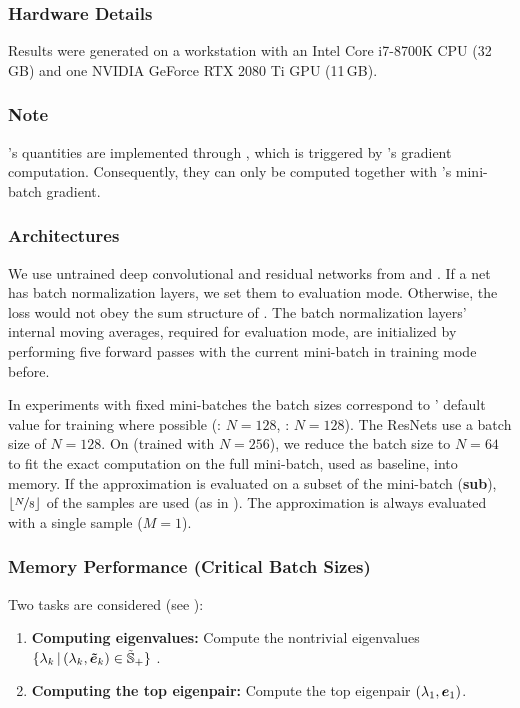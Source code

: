 \subsubsection{Hardware Details}

Results were generated on a workstation with an Intel Core i7-8700K CPU (32\,GB)
and one NVIDIA GeForce RTX 2080 Ti GPU (11\,GB).

\subsubsection{Note}

\vivit{}'s quantities are implemented through \backpack, which is triggered by
\pytorch's gradient computation. Consequently, they can only be computed
together with \pytorch{}'s mini-batch gradient.

\subsubsection{Architectures}

We use untrained deep convolutional and residual networks from \deepobs
\cite{schneider2019deepobs} and \cite{idelbayev2018proper}. If a net has batch
normalization layers, we set them to evaluation mode. Otherwise, the loss would
not obey the sum structure of . The batch
normalization layers' internal moving averages, required for evaluation mode,
are initialized by performing five forward passes with the current mini-batch in
training mode before.

In experiments with fixed mini-batches the batch sizes correspond to \deepobs'
default value for training where possible (\cifarten: $N=128$, \fmnist:
$N=128$). The ResNets use a batch size of $N=128$. On \cifarhun
(trained with $N=256$), we reduce the batch size to $N=64$ to fit the exact
computation on the full mini-batch, used as baseline, into memory. If the \ggn
approximation is evaluated on a subset of the mini-batch (\textbf{sub}),
$\lfloor \nicefrac{N}{8} \rfloor$ of the samples are used (as in
\cite{zhang2017blockdiagonal}). The \mc approximation is always evaluated with a
single sample ($M=1$).

\subsubsection{Memory Performance (Critical Batch Sizes)}

Two tasks are considered (see ):
\begin{enumerate}
\item \textbf{Computing eigenvalues:} Compute the nontrivial eigenvalues
  $\{\lambda_{k}\,|\, (\lambda_{k}, \bm{\tilde{e}}_{k}) \in \tilde{{\mathbb{S}}}_+\}$ .
\item \textbf{Computing the top eigenpair:} Compute the top eigenpair
  $(\lambda_{1}, {\bm{e}}_{1})$.
\end{enumerate}

